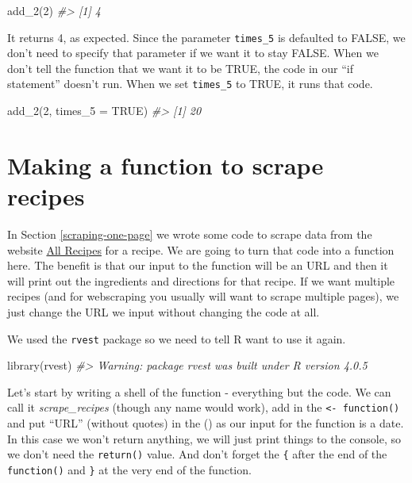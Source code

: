 \documentclass[
  12pt,
  openany]{book}
\newenvironment{Shaded}{\begin{snugshade}}{\end{snugshade}}
\newcommand{\AttributeTok}[1]{\textcolor[rgb]{0.61,0.61,0.61}{#1}}
\newcommand{\CommentTok}[1]{\textcolor[rgb]{0.37,0.37,0.37}{\textit{#1}}}
\newcommand{\ConstantTok}[1]{\textcolor[rgb]{0,0,0}{#1}}
\newcommand{\DecValTok}[1]{\textcolor[rgb]{0.06,0.06,0.06}{#1}}
\newcommand{\FunctionTok}[1]{\textcolor[rgb]{0,0,0}{#1}}
\newcommand{\NormalTok}[1]{#1}
\begin{document}
\begin{Shaded}
\begin{Highlighting}[]
\FunctionTok{add\_2}\NormalTok{(}\DecValTok{2}\NormalTok{)}
\CommentTok{\#\textgreater{} [1] 4}
\end{Highlighting}
\end{Shaded}

It returns 4, as expected. Since the parameter \texttt{times\_5} is defaulted to FALSE, we don't need to specify that parameter if we want it to stay FALSE. When we don't tell the function that we want it to be TRUE, the code in our ``if statement'' doesn't run. When we set \texttt{times\_5} to TRUE, it runs that code.

\begin{Shaded}
\begin{Highlighting}[]
\FunctionTok{add\_2}\NormalTok{(}\DecValTok{2}\NormalTok{, }\AttributeTok{times\_5 =} \ConstantTok{TRUE}\NormalTok{)}
\CommentTok{\#\textgreater{} [1] 20}
\end{Highlighting}
\end{Shaded}

\hypertarget{recipes-function}{%
\section{Making a function to scrape recipes}\label{recipes-function}}

In Section \ref{scraping-one-page} we wrote some code to scrape data from the website \href{https://www.allrecipes.com/}{All Recipes} for a recipe. We are going to turn that code into a function here. The benefit is that our input to the function will be an URL and then it will print out the ingredients and directions for that recipe. If we want multiple recipes (and for webscraping you usually will want to scrape multiple pages), we just change the URL we input without changing the code at all.

We used the \texttt{rvest} package so we need to tell R want to use it again.

\begin{Shaded}
\begin{Highlighting}[]
\FunctionTok{library}\NormalTok{(rvest)}
\CommentTok{\#\textgreater{} Warning: package \textquotesingle{}rvest\textquotesingle{} was built under R version 4.0.5}
\end{Highlighting}
\end{Shaded}

Let's start by writing a shell of the function - everything but the code. We can call it \emph{scrape\_recipes} (though any name would work), add in the \texttt{\textless{}-\ function()} and put ``URL'' (without quotes) in the () as our input for the function is a date. In this case we won't return anything, we will just print things to the console, so we don't need the \texttt{return()} value. And don't forget the \texttt{\{} after the end of the \texttt{function()} and \texttt{\}} at the very end of the function.
\end{document}
